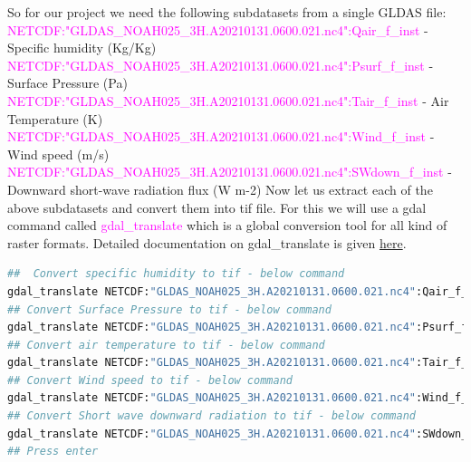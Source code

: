 \newline
So for our project we need the following subdatasets from a single GLDAS file:
\newline
\vspace{0.5\baselineskip}
\textcolor{magenta}{NETCDF:"GLDAS\_NOAH025\_3H.A20210131.0600.021.nc4":Qair\_f\_inst} - Specific humidity (Kg/Kg)
\newline
\vspace{0.5\baselineskip}
\textcolor{magenta}{NETCDF:"GLDAS\_NOAH025\_3H.A20210131.0600.021.nc4":Psurf\_f\_inst} - Surface Pressure (Pa)
\newline
\vspace{0.5\baselineskip}
\textcolor{magenta}{NETCDF:"GLDAS\_NOAH025\_3H.A20210131.0600.021.nc4":Tair\_f\_inst} - Air Temperature (K)
\newline
\vspace{0.5\baselineskip}
\textcolor{magenta}{NETCDF:"GLDAS\_NOAH025\_3H.A20210131.0600.021.nc4":Wind\_f\_inst } - Wind speed (m/s)
\newline
\vspace{0.5\baselineskip}
\textcolor{magenta}{NETCDF:"GLDAS\_NOAH025\_3H.A20210131.0600.021.nc4":SWdown\_f\_inst} - Downward short-wave radiation flux (W m-2)
\newline
Now let us extract each of the above subdatasets and convert them into tif file. For this we will use a gdal command called \textcolor{magenta}{gdal\_translate} which is a global conversion tool for all kind of raster formats. Detailed documentation on gdal\_translate is given \href{https://gdal.org/programs/gdal_translate.html}{here}.
\begin{lstlisting}[language=Bash]
##  Convert specific humidity to tif - below command
gdal_translate NETCDF:"GLDAS_NOAH025_3H.A20210131.0600.021.nc4":Qair_f_inst GLDAS_NOAH025_3H_A20210131_0600_Qair.tif
## Convert Surface Pressure to tif - below command
gdal_translate NETCDF:"GLDAS_NOAH025_3H.A20210131.0600.021.nc4":Psurf_f_inst GLDAS_NOAH025_3H_A20210131_0600_Psurf.tif
## Convert air temperature to tif - below command
gdal_translate NETCDF:"GLDAS_NOAH025_3H.A20210131.0600.021.nc4":Tair_f_inst GLDAS_NOAH025_3H_A20210131_0600_Tair.tif
## Convert Wind speed to tif - below command
gdal_translate NETCDF:"GLDAS_NOAH025_3H.A20210131.0600.021.nc4":Wind_f_inst GLDAS_NOAH025_3H_A20210131_0600_Wind.tif
## Convert Short wave downward radiation to tif - below command
gdal_translate NETCDF:"GLDAS_NOAH025_3H.A20210131.0600.021.nc4":SWdown_f_tavg GLDAS_NOAH025_3H_A20210131_0600_SWdown.tif
## Press enter
\end{lstlisting}
